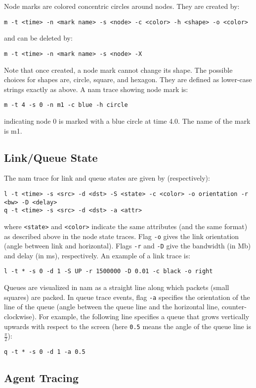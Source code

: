 Node marks are colored concentric circles around nodes. 
They are created by:
\begin{verbatim}
m -t <time> -n <mark name> -s <node> -c <color> -h <shape> -o <color>
\end{verbatim}
and can be deleted by:
\begin{verbatim}
m -t <time> -n <mark name> -s <node> -X
\end{verbatim}
Note that once created, a node mark cannot change its shape. The possible
choices for shapes are, circle, square, and hexagon. They are defined as 
lower-case strings exactly as above. A nam trace showing node mark is:
\begin{verbatim}
m -t 4 -s 0 -n m1 -c blue -h circle
\end{verbatim}
indicating node 0 is marked with a blue circle at time 4.0. The name of
the mark is m1.

\subsection{Link/Queue State}

The nam trace for link and queue states are given by (respectively):
\begin{verbatim}
l -t <time> -s <src> -d <dst> -S <state> -c <color> -o orientation -r <bw> -D <delay>
q -t <time> -s <src> -d <dst> -a <attr>
\end{verbatim}
where {\tt <state>} and {\tt <color>} indicate the same attributes
(and the same format) as described above in the node state traces. 
Flag {\tt -o} gives the link orientation (angle between link and
horizontal). 
Flags {\tt -r} and {\tt -D} give the bandwidth (in Mb) and delay (in
ms), respectively.
An example of a link trace is:
\begin{verbatim}
l -t * -s 0 -d 1 -S UP -r 1500000 -D 0.01 -c black -o right
\end{verbatim}
Queues are visualized in nam as a straight line along which packets
(small squares) are packed.
In queue trace events, flag {\tt -a} specifies the orientation of the
line of the queue (angle between the queue line and the horizontal
line, counter-clockwise). 
For example, the following line specifies a queue that grows
vertically upwards with respect to the screen (here {\tt 0.5} means
the angle of the queue line is $\frac{\pi}{2}$):
\begin{verbatim}
q -t * -s 0 -d 1 -a 0.5
\end{verbatim}

\subsection{Agent Tracing}

